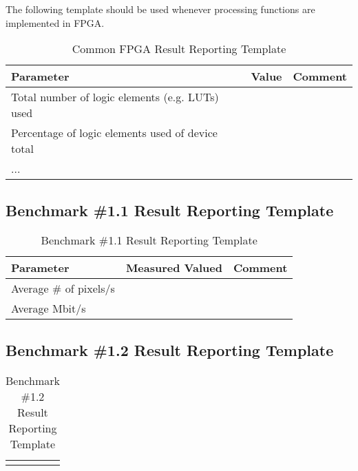 The following template should be used whenever processing functions are implemented in FPGA. 

\begin{table}[!h]
    \centering
    \begin{tabular}{|l|l|l|}
        \hline
        Parameter                           & Value  & Comment \\ \hline
        \hline
        Total number of logic elements (e.g. LUTs) used     &  & \\ \hline
        Percentage of logic elements used of device total   &  & \\ \hline
        ... & & \\ \hline
        
    \end{tabular}
    \caption{Common FPGA Result Reporting Template}
    \label{tab:fpga_report_template}
\end{table}

\newpage
\subsection{Benchmark \#1.1 Result Reporting Template}

\begin{table}[!h]
    \centering
    \begin{tabular}{|l|l|l|}
        \hline
        Parameter               & Measured Valued   & Comment \\ \hline
        \hline
        Average \# of pixels/s  &  & \\ \hline
        Average Mbit/s    &  & \\ \hline
    \end{tabular}
    \caption{Benchmark \#1.1 Result Reporting Template}
    \label{tab:bm1_1_report_template}
\end{table}

\subsection{Benchmark \#1.2 Result Reporting Template}

\begin{table}[!h]
    \centering
    \begin{tabular}{|c|c|}
        \hline
         &  \\ \hline
         &  \\ \hline
    \end{tabular}
    \caption{Benchmark \#1.2 Result Reporting Template}
    \label{tab:bm1_2_report_template}
\end{table}

